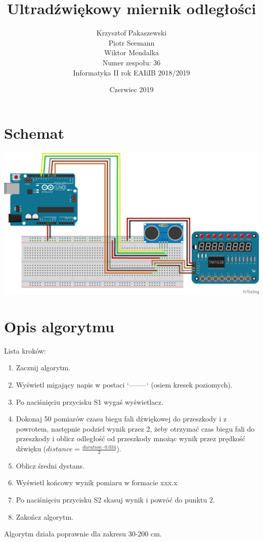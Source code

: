 \documentclass{article}
\title{Ultradźwiękowy miernik odległości}
\author{Krzysztof Pakaszewski\\Piotr Seemann\\Wiktor Mendalka\\Numer zespołu: 36\\Informatyka II rok EAIiIB 2018/2019}
\date{Czerwiec 2019}
\begin{document}
\maketitle

\section{Schemat}
\includegraphics[scale=0.5]{sketch_bb.png}

\section{Opis algorytmu}

Lista kroków:
 \begin{enumerate}
    \item Zacznij algorytm.
    \item Wyświetl migający napis w postaci ‘--------‘ (osiem kresek poziomych).
    \item Po naciśnięciu przycisku S1 wygaś wyświetlacz.
    \item Dokonaj 50 pomiarów czasu biegu fali dźwiękowej do przeszkody i z powrotem, następnie podziel wynik przez 2, żeby otrzymać czas biegu fali do przeszkody i oblicz odległość od przeszkody mnożąc wynik przez prędkość dźwięku ($distance = \frac{duration \cdot 0.034}{2}$).
    \item Oblicz średni dystans.
    \item Wyświetl końcowy wynik pomiaru w formacie xxx.x
    \item Po naciśnięciu przycisku S2 skasuj wynik i powróć do punktu 2.
    \item Zakończ algorytm.
\end{enumerate}

Algorytm działa poprawnie dla zakresu  30-200 cm.
\end{document}
